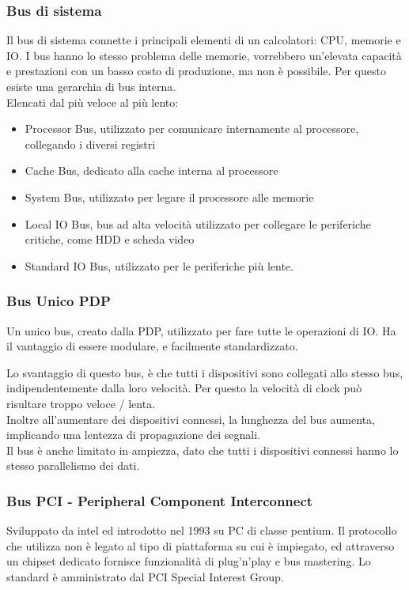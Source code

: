 \documentclass[../template]{subfiles}
\begin{document}
\subsubsection{Bus di sistema}
Il bus di sistema connette i principali elementi di un calcolatori: CPU, memorie e IO.
I bus hanno lo stesso problema delle memorie, vorrebbero un'elevata capacità e prestazioni con un basso costo di produzione, ma non è possibile. Per questo esiste una gerarchia di bus interna.
\\
Elencati dal più veloce al più lento:
\begin{itemize}
    \item Processor Bus, utilizzato per comunicare internamente al processore, collegando i diversi registri
    \item Cache Bus, dedicato alla cache interna al processore
    \item System Bus, utilizzato per legare il processore alle memorie
    \item Local IO Bus, bus ad alta velocità utilizzato per collegare le periferiche critiche, come HDD e scheda video
    \item Standard IO Bus, utilizzato per le periferiche più lente.
\end{itemize}

\subsubsection{Bus Unico PDP}
Un unico bus, creato dalla PDP, utilizzato per fare tutte le operazioni di IO. Ha il vantaggio di essere modulare, e facilmente standardizzato.

Lo svantaggio di questo bus, è che tutti i dispositivi sono collegati allo stesso bus, indipendentemente dalla loro velocità.
Per questo la velocità di clock può risultare troppo veloce / lenta.
\\
Inoltre all'aumentare dei dispositivi connessi, la lunghezza del bus aumenta, implicando una lentezza di propagazione dei segnali.
\\
Il bus è anche limitato in ampiezza, dato che tutti i dispositivi connessi hanno lo stesso parallelismo dei dati.

\subsubsection{Bus PCI - Peripheral Component Interconnect}
Sviluppato da intel ed introdotto nel 1993 su PC di classe pentium. Il protocollo che utilizza non è legato al tipo di piattaforma su cui è impiegato, ed attraverso un chipset dedicato fornisce funzionalità di plug'n'play e bus mastering.
Lo standard è amministrato dal PCI Special Interest Group.
\end{document}
